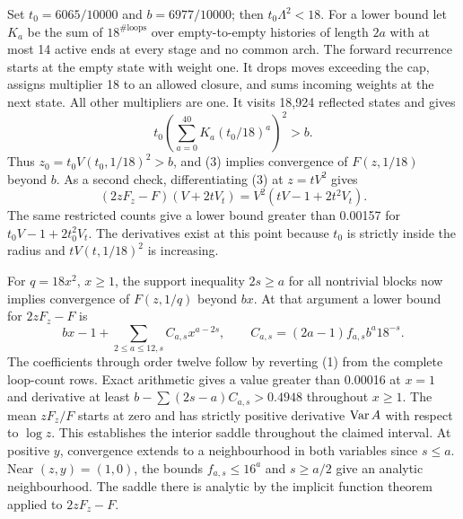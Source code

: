 Set \(t_0=6065/10000\) and \(b=6977/10000\); then
\(t_0\Lambda^2<18\). For a lower bound let \(K_a\) be the sum of
\(18^{\#\text{loops}}\) over empty-to-empty histories of length \(2a\)
with at most 14 active ends at every stage and no common arch.
The forward recurrence starts at the empty state with weight one.
It drops moves exceeding the cap, assigns multiplier 18 to an allowed
closure, and sums incoming weights at the next state. All other
multipliers are one. It visits 18,924 reflected states and gives
\[
        t_0\left(\sum_{a=0}^{40}K_a(t_0/18)^a\right)^2 > b .
\]
Thus \(z_0=t_0V(t_0,1/18)^2>b\), and (3) implies convergence of
\(F(z,1/18)\) beyond \(b\). As a second check, differentiating (3)
at \(z=tV^2\) gives
\[
 (2zF_z-F)(V+2tV_t)=V^2(tV-1+2t^2V_t).
\]
The same restricted counts give a lower bound greater than 0.00157 for
\(t_0V-1+2t_0^2V_t\). The derivatives exist at this point because
\(t_0\) is strictly inside the radius and \(tV(t,1/18)^2\) is increasing.

For \(q=18x^2\), \(x\ge1\), the support inequality \(2s\ge a\) for all
nontrivial blocks now implies convergence of \(F(z,1/q)\) beyond \(bx\).
At that argument a lower bound for \(2zF_z-F\) is
\[
 bx-1+\sum_{2\le a\le12,s} C_{a,s}x^{a-2s},\qquad
 C_{a,s}=(2a-1)f_{a,s} b^a18^{-s}.
\]
The coefficients through order twelve follow by reverting (1) from the
complete loop-count rows. Exact arithmetic gives a value greater than
0.00016 at \(x=1\) and derivative at least
\(b-\sum(2s-a)C_{a,s}>0.4948\) throughout \(x\ge1\).
The mean \(zF_z/F\) starts at zero and has strictly positive derivative
\(\operatorname{Var} A\) with respect to \(\log z\). This establishes the interior
saddle throughout the claimed interval. At positive \(y\), convergence
extends to a neighbourhood in both variables since \(s\le a\).
Near \((z,y)=(1,0)\), the bounds \(f_{a,s}\le16^a\) and \(s\ge a/2\)
give an analytic neighbourhood. The saddle there is analytic by the
implicit function theorem applied to \(2zF_z-F\).
